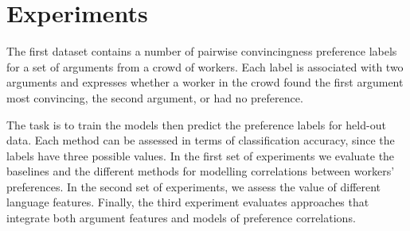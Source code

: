 \section{Experiments}\label{sec:expts}

The first dataset contains a number of pairwise convincingness preference labels for a set of arguments from a crowd of workers. Each label is associated with two arguments and expresses whether a worker in the crowd found the first argument most convincing, the second argument, or had no preference.  

The task is to train the models then predict the preference labels for held-out data. Each method can be assessed in terms of classification accuracy, since the labels have three possible values. In the first set of experiments we evaluate the baselines and the different methods for modelling correlations between workers' preferences. In the second set of experiments, we assess the value of different language features. Finally, the third experiment evaluates approaches that integrate both argument features and models of preference correlations.
